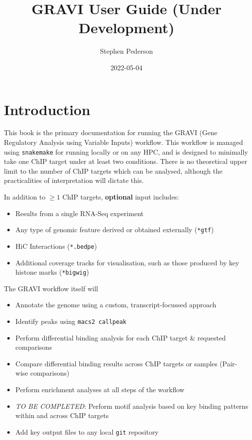 \documentclass[
]{book}
\title{GRAVI User Guide (Under Development)}
\author{Stephen Pederson}
\date{2022-05-04}
\providecommand{\tightlist}{%
  \setlength{\itemsep}{0pt}\setlength{\parskip}{0pt}}
\begin{document}
\maketitle

{
\setcounter{tocdepth}{1}
\tableofcontents
}
\hypertarget{introduction}{%
\chapter{Introduction}\label{introduction}}

This book is the primary documentation for running the GRAVI (Gene Regulatory Analysis using Variable Inputs) workflow.
This workflow is managed using \texttt{snakemake} for running locally or on any HPC, and is designed to minimally take one ChIP target under at least two conditions.
There is no theoretical upper limit to the number of ChIP targets which can be analysed, although the practicalities of interpretation will dictate this.

In addition to \(\geq 1\) ChIP targets, \textbf{optional} input includes:

\begin{itemize}
\tightlist
\item
  Results from a single RNA-Seq experiment
\item
  Any type of genomic feature derived or obtained externally (\texttt{*gtf})
\item
  HiC Interactions (\texttt{*.bedpe})
\item
  Additional coverage tracks for visualisation, such as those produced by key histone marks (\texttt{*bigwig})
\end{itemize}

The GRAVI workflow itself will

\begin{itemize}
\tightlist
\item
  Annotate the genome using a custom, transcript-focussed approach
\item
  Identify peaks using \texttt{macs2\ callpeak}
\item
  Perform differential binding analysis for each ChIP target \& requested comparisons
\item
  Compare differential binding results across ChIP targets or samples (Pair-wise comparisons)
\item
  Perform enrichment analyses at all steps of the workflow
\item
  \emph{TO BE COMPLETED}: Perform motif analysis based on key binding patterns within and across ChIP targets
\item
  Add key output files to any local \texttt{git} repository
\end{itemize}
\end{document}
